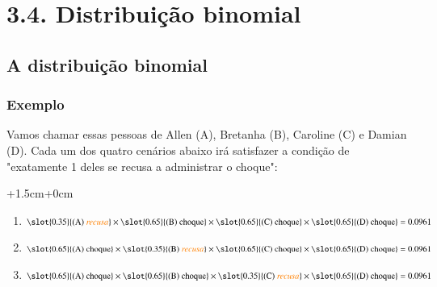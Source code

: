 
\section{3.4. Distribuição binomial}


\subsection{A distribuição binomial}


\begin{frame}
\frametitle{Exemplo}
\justifying
{}
\pause
\justifying
Vamos chamar essas pessoas de Allen (A), Bretanha (B), Caroline (C) e Damian (D). Cada um dos quatro cenários abaixo irá satisfazer a condição de "exatamente 1 deles se recusa a administrar o choque":\\
\vspace{0.25cm}
\pause
\begin{changemargin}{+1.5cm}{+0cm}
{\footnotesize
\begin{enumerate}

\item[Cenário 1:] $\slot{0.35}{\text{(A) \orange{recusa}}} \times \slot{0.65}{\text{(B) choque}} \times \slot{0.65}{\text{(C) choque}} \times \slot{0.65}{\text{(D) choque}} = 0.0961$
\pause
\item[Cenário 2:] $\slot{0.65}{\text{(A) choque}} \times \slot{0.35}{\text{(B) \orange{recusa}}}\times \slot{0.65}{\text{(C) choque}} \times \slot{0.65}{\text{(D) choque}} = 0.0961$
\pause
\item[Cenário 3:] $\slot{0.65}{\text{(A) choque}} \times \slot{0.65}{\text{(B) choque}} \times \slot{0.35}{\text{(C) \orange{recusa}}}\times \slot{0.65}{\text{(D) choque}} = 0.0961$
\pause
\end{enumerate}
}
\end{changemargin}
\end{frame}

